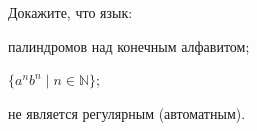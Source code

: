 Докажите, что язык:
\begin{enumcyr}
    \item палиндромов над конечным алфавитом;
    \item $\{a^nb^n \mid n \in \mathbb{N}\}$;
\end{enumcyr}
не является регулярным (автоматным).